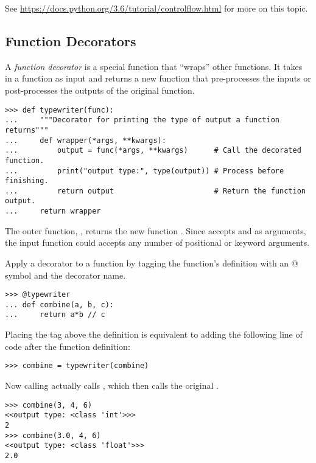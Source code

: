 See \url{https://docs.python.org/3.6/tutorial/controlflow.html} for more on this topic.

\subsection*{Function Decorators} %

A \emph{function decorator} is a special function that ``wraps'' other functions.
It takes in a function as input and returns a new function that pre-processes the inputs or post-processes the outputs of the original function.

\begin{lstlisting}
>>> def typewriter(func):
...     """Decorator for printing the type of output a function returns"""
...     def wrapper(*args, **kwargs):
...         output = func(*args, **kwargs)      # Call the decorated function.
...         print("output type:", type(output)) # Process before finishing.
...         return output                       # Return the function output.
...     return wrapper
\end{lstlisting}

The outer function, , returns the new function .
Since  accepts  and  as arguments, the input function  could accepts any number of positional or keyword arguments.

Apply a decorator to a function by tagging the function's definition with an @ symbol and the decorator name.

\begin{lstlisting}
>>> @typewriter
... def combine(a, b, c):
...     return a*b // c
\end{lstlisting}

Placing the tag above the definition is equivalent to adding the following line of code after the function definition:

\begin{lstlisting}
>>> combine = typewriter(combine)
\end{lstlisting}

Now calling  actually calls , which then calls the original .

\begin{lstlisting}
>>> combine(3, 4, 6)
<<output type: <class 'int'>>>
2
>>> combine(3.0, 4, 6)
<<output type: <class 'float'>>>
2.0
\end{lstlisting}

